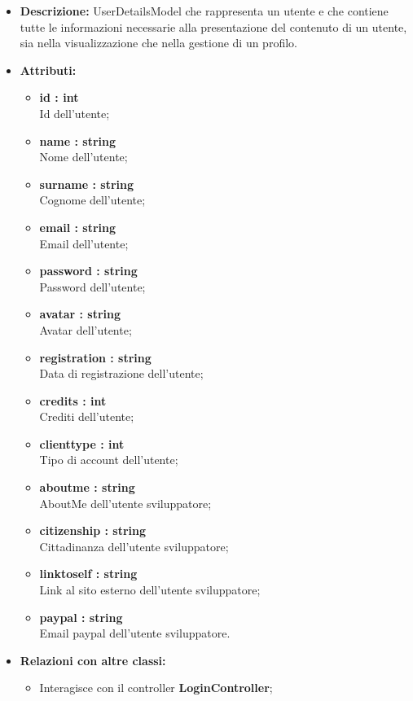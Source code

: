\begin{itemize}
	\item \textbf{Descrizione:} UserDetailsModel che rappresenta un utente e che contiene tutte le informazioni
necessarie alla presentazione del contenuto di un utente, sia nella visualizzazione che nella gestione di un profilo.
	\item \textbf{Attributi:}
		\begin{itemize}
			\item \textbf{id : int}\\
			Id dell'utente;
			\item \textbf{name : string}\\
			Nome dell'utente;
			\item \textbf{surname : string}\\
			Cognome dell'utente;
			\item \textbf{email : string}\\
			Email dell'utente;
			\item \textbf{password : string}\\
			Password dell'utente;
			\item \textbf{avatar : string}\\
			Avatar dell'utente;
			\item \textbf{registration : string}\\
			Data di registrazione dell'utente;
			\item \textbf{credits : int}\\
			Crediti dell'utente;
			\item \textbf{clienttype : int}\\
			Tipo di account dell'utente;
			\item \textbf{aboutme : string}\\
			AboutMe dell'utente sviluppatore;
			\item \textbf{citizenship : string}\\
			Cittadinanza dell'utente sviluppatore;
			\item \textbf{linktoself : string}\\
			Link al sito esterno dell'utente sviluppatore;
			\item \textbf{paypal : string}\\
			Email paypal dell'utente sviluppatore.
		\end{itemize}
	\item \textbf{Relazioni con altre classi:}
		\begin{itemize}
			\item Interagisce con il controller \textbf{LoginController};

\end{itemize}
\end{itemize}
